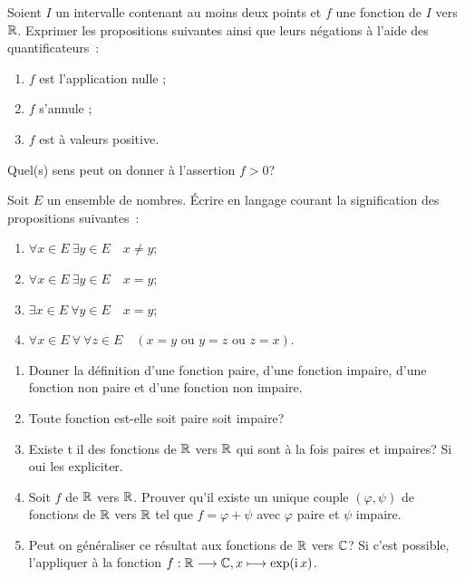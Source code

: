 \begin{exercice}
  Soient \(I\) un intervalle contenant au moins deux points et \(f\) une 
  fonction de \(I\) vers \(\mathbb{R}\). Exprimer les propositions suivantes ainsi que 
  leurs négations à l'aide des quantificateurs~:
  \begin{enumerate}
    \item \(f\) est l'application nulle ;
    \item \(f\) s'annule ;
    \item \(f\) est à valeurs positive.
  \end{enumerate}
  Quel(s) sens peut on donner à l'assertion \(f>0\)?
\end{exercice}

\begin{exercice}
  Soit \(E\) un ensemble de nombres. Écrire en langage courant la signification 
  des propositions suivantes~:
  \begin{enumerate}
    \item \(\forall x \in E \ \exists y \in E \quad x \neq y\);
    \item \(\forall x \in E \ \exists y \in E \quad x = y\);
    \item \(\exists x \in E \ \forall y \in E \quad x = y\);
    \item \(\forall x \in E \ \forall \ \forall z \in E \quad (x=y \textrm{~ou~}
      y=z \textrm{~ou~} z=x)\).
  \end{enumerate}
\end{exercice}

\begin{exercice}
  \begin{enumerate}
    \item Donner la définition d'une fonction paire, d'une fonction impaire,
      d'une fonction non paire et d'une fonction non impaire.
    \item Toute fonction est-elle soit paire soit impaire?
    \item Existe t il des fonctions de \(\mathbb{R}\) vers \(\mathbb{R}\) qui sont à la fois
      paires  et impaires? Si oui les expliciter.
    \item Soit \(f\) de \(\mathbb{R}\) vers \(\mathbb{R}\). Prouver qu'il existe un unique
      couple \((\varphi, \psi)\) de fonctions de \(\mathbb{R}\) vers \(\mathbb{R}\) tel que
      \(f=\varphi+\psi\) avec \(\varphi\) paire et \(\psi\) impaire.
    \item Peut on généraliser ce résultat aux fonctions de \(\mathbb{R}\) vers \(\mathbb{C}\)?
      Si c'est possible, l'appliquer à la fonction
      \(f:\mathbb{R} \longrightarrow \mathbb{C}, x \longmapsto \exp(\operatorname{i} x)\).
  \end{enumerate}
\end{exercice}


